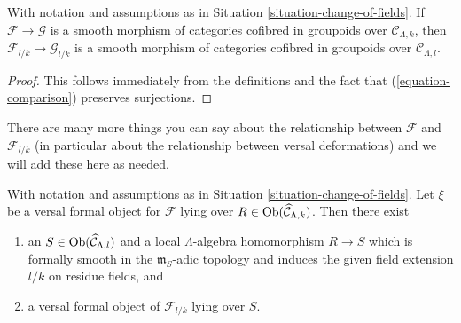 \begin{lemma}
\label{lemma-change-of-fields-smooth}
With notation and assumptions as in Situation \ref{situation-change-of-fields}.
If $\mathcal{F} \to \mathcal{G}$ is a smooth morphism of categories cofibred
in groupoids over $\mathcal{C}_{\Lambda, k}$, then
$\mathcal{F}_{l/k} \to \mathcal{G}_{l/k}$ is a smooth morphism of categories
cofibred in groupoids over $\mathcal{C}_{\Lambda, l}$.
\end{lemma}

\begin{proof}
This follows immediately from the definitions and the fact that
(\ref{equation-comparison}) preserves surjections.
\end{proof}

\noindent
There are many more things you can say about the relationship between
$\mathcal{F}$ and $\mathcal{F}_{l/k}$ (in particular about the relationship
between versal deformations) and we will add these here as needed.

\begin{lemma}
\label{lemma-change-of-field-versal-ring}
With notation and assumptions as in Situation \ref{situation-change-of-fields}.
Let $\xi$ be a versal formal object for $\mathcal{F}$ lying over
$R \in \mathop{\mathrm{Ob}}\nolimits(\widehat{\mathcal{C}}_{\Lambda, k})$. Then there exist
\begin{enumerate}
\item an $S \in \mathop{\mathrm{Ob}}\nolimits(\widehat{\mathcal{C}}_{\Lambda, l})$
and a local $\Lambda$-algebra homomorphism $R \to S$ which is
formally smooth in the $\mathfrak m_S$-adic topology and induces
the given field extension $l/k$ on residue fields, and
\item a versal formal object of $\mathcal{F}_{l/k}$ lying over $S$.
\end{enumerate}
\end{lemma}

